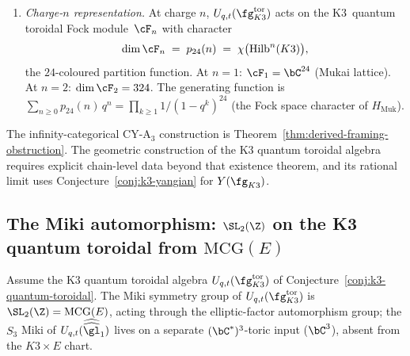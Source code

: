 \begin{conjecture}
\begin{enumerate}[label=\textup{(\roman*)}]
\item \emph{Charge-$n$ representation.}
At charge $n$, $U_{q,t}(\fg_{K3}^{\mathrm{tor}})$ acts on the
K3~quantum toroidal Fock module~$\cF_n$ with character
\[
 \dim \cF_n \;=\; p_{24}(n)
 \;=\; \chi\bigl(\mathrm{Hilb}^n(K3)\bigr),
\]
the $24$-coloured partition function.
At $n = 1$: $\cF_1 = \bC^{24}$ (Mukai lattice).
At $n = 2$: $\dim \cF_2 = 324$.
The generating function is
$\sum_{n \geq 0} p_{24}(n)\, q^n
= \prod_{k \geq 1} 1/(1 - q^k)^{24}$
(the Fock space character of $H_{\mathrm{Muk}}$).
\end{enumerate}
The infinity-categorical CY-A$_3$ construction is
Theorem~\ref{thm:derived-framing-obstruction}. The geometric
construction of the K3 quantum toroidal algebra requires explicit
chain-level data beyond that existence theorem, and its rational limit
uses Conjecture~\ref{conj:k3-yangian} for \(Y(\fg_{K3})\).
\end{conjecture}

\subsection{The Miki automorphism: $\SL_2(\Z)$ on the K3 quantum toroidal from $\mathrm{MCG}(E)$}

\begin{proposition}
\label{prop:k3-qt-no-s3-miki}
Assume the K3 quantum toroidal algebra
$U_{q, t}(\fg_{K3}^{\mathrm{tor}})$ of
Conjecture~\ref{conj:k3-quantum-toroidal}. The Miki symmetry group of
$U_{q, t}(\fg_{K3}^{\mathrm{tor}})$ is $\SL_2(\Z) = \mathrm{MCG}(E)$,
acting through the elliptic-factor automorphism group; the $S_3$
Miki of $U_{q, t}(\widehat{\widehat{\gl}}_1)$ lives on a separate
$(\bC^*)^3$-toric input ($\bC^3$), absent from the $K3 \times E$
chart.
\end{proposition}

